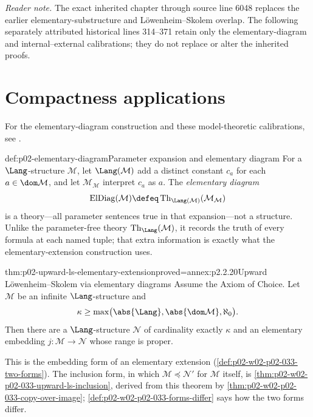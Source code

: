 \noindent\textit{Reader note.} The exact inherited chapter through source line 6048
replaces the earlier elementary-substructure and L\"owenheim--Skolem overlap.
The following separately attributed historical lines 314--371 retain only
the elementary-diagram and internal--external calibrations; they do not replace
or alter the inherited proofs.

\section{Compactness applications}
\label{sec:p02-first-order-compactness-applications}

For the elementary-diagram construction and these model-theoretic
calibrations, see \cite{Hodges1993,Marker2002}.

\begin{hbdefinition}{def:p02-elementary-diagram}{Parameter expansion and elementary diagram}
For a \(\Lang\)-structure \(\mathcal M\), let
\(\Lang(\mathcal M)\) add a distinct constant \(c_a\) for each
\(a\in\dom\mathcal M\), and let \(\mathcal M_{\mathcal M}\) interpret
\(c_a\) as \(a\).  The \emph{elementary diagram}
\[
 \operatorname{ElDiag}(\mathcal M)
 \defeq
 \operatorname{Th}_{\Lang(\mathcal M)}(\mathcal M_{\mathcal M})
\]
is a theory---all parameter sentences true in that expansion---not a
structure.  Unlike the parameter-free theory
\(\operatorname{Th}_{\Lang}(\mathcal M)\), it records the truth of every
formula at each named tuple; that extra information is exactly what the
elementary-extension construction uses.
\end{hbdefinition}

\begin{hbtheorem}{thm:p02-upward-ls-elementary-extension}{proved=annex:p2.2.20}{Upward L\"owenheim--Skolem via elementary diagrams}
Assume the Axiom of Choice.  Let \(\mathcal M\) be an infinite
\(\Lang\)-structure and
\[
 \kappa\geq
 \max\bigl(\abs{\Lang},\abs{\dom\mathcal M},\aleph_0\bigr).
\]
Then there are a \(\Lang\)-structure \(\mathcal N\) of cardinality exactly
\(\kappa\) and an elementary embedding
\(j:\mathcal M\to\mathcal N\) whose range is proper.
\end{hbtheorem}

This is the embedding form of an elementary extension
(\cref{def:p02-w02-p02-033-two-forms}).  The inclusion form, in which
\(\mathcal M\preccurlyeq\mathcal N'\) for \(\mathcal M\) itself, is
\cref{thm:p02-w02-p02-033-upward-ls-inclusion}, derived from this theorem by
\cref{thm:p02-w02-p02-033-copy-over-image}; \cref{def:p02-w02-p02-033-forms-differ}
says how the two forms differ.

